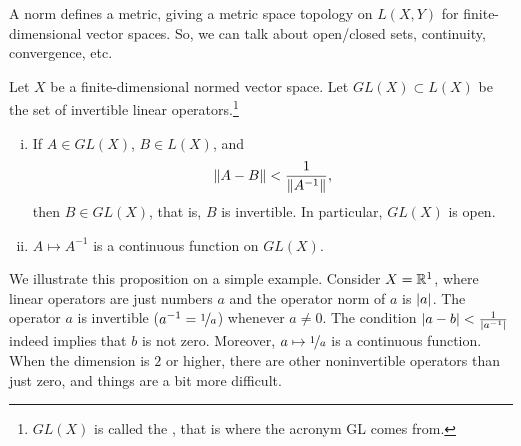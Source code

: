 A norm defines a metric,
giving a metric space topology on $L(X,Y)$ for finite-dimensional vector spaces.
So, we can talk
about open/closed sets, continuity, convergence, etc.

\begin{prop} \label{prop:finitedimpropinv}
\pagebreak[2]
Let $X$ be a finite-dimensional normed vector space.
Let $GL(X) \subset L(X)$ be the set of invertible linear
operators.\footnote{$GL(X)$ is called the
\emph{}, that is where the acronym GL
comes from.}
\begin{enumerate}[(i)]
\item \label{finitedimpropinv:i}
If $A \in GL(X)$, $B \in L(X)$, and
\begin{equation} \label{eqcontineq}
\lVert {A-B} \rVert <  \frac{1}{\lVert {A^{-1}} \rVert},
\end{equation}
then $B \in GL(X)$, that is, $B$ is invertible.
In particular, $GL(X)$ is open.
\item \label{finitedimpropinv:ii}
$A \mapsto A^{-1}$ is a continuous
function on $GL(X)$.
\end{enumerate}
\end{prop}

We illustrate this proposition on a simple example.
Consider $X={\mathbb{R}}^1$, where linear operators are just
numbers $a$ and the operator norm of $a$ is $\lvert {a} \rvert$.
The operator $a$ is invertible ($a^{-1} = \nicefrac{1}{a}$)
whenever $a \neq 0$.  The condition $\lvert {a-b} \rvert < \frac{1}{\lvert {a^{-1}} \rvert}$
indeed implies that $b$ is not zero.  Moreover, $a \mapsto \nicefrac{1}{a}$
is a continuous function.
When the dimension is $2$ or higher,
there are other noninvertible operators than just zero,
and things are a bit more difficult.

